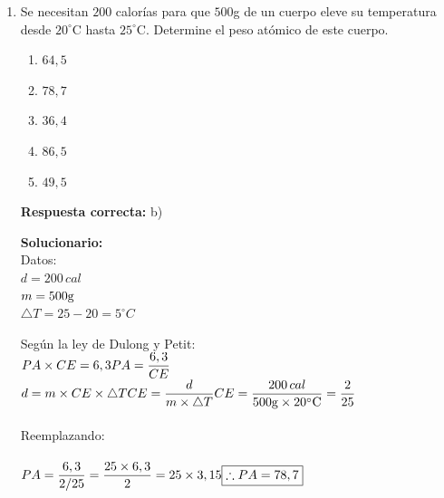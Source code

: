 \begin{enumerate}[resume]
	
	\item Se necesitan $200$ calorías para que $500$g de un cuerpo eleve su temperatura desde $20^\circ$C hasta $25^\circ$C. Determine el peso atómico de este cuerpo. 
	\begin{enumerate}[label=\alph*)]
		\item $64,5$
		\item $78,7$
		\item $36,4$
		\item $86,5$
		\item $49,5$
	\end{enumerate}
	
	\textbf{Respuesta correcta:} b)
	
	\vspace{2mm}
	\textbf{Solucionario:}\\
	
	Datos:\\
	$d=200\,cal$\\
	$m=500 \rm{g}$\\
	$\bigtriangleup T=25-20=5^\circ C$
	
	Según la ley de Dulong y Petit:\\
	$PA \times CE = 6,3\\
	PA = \dfrac{{6,3}}{{CE}}$\\
	
	$d=m\times CE\times \bigtriangleup T\\\\
	CE = \dfrac{{d}}{{m\times \bigtriangleup T}}\\\\
	CE = \dfrac{{200\,cal}}{{500 \rm{g}\times 20^\circ C}}=\dfrac{2}{25}$\\\\
	
	Reemplazando:\\\\
	$PA = \dfrac{{6,3}}{{2/25}} = \dfrac{{25 \times 6,3}}{2} = 25 \times 3,15\\\\
	\boxed{{\therefore PA = 78,7}}$
	
	
\end{enumerate}


